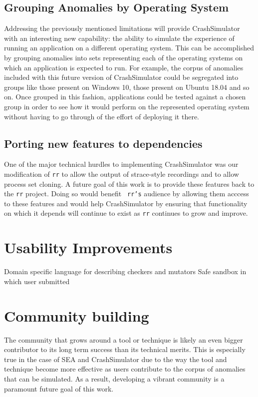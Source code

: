\documentclass[twocolumn]{article}
\begin{document}
\subsection{Grouping Anomalies by Operating System}

Addressing the previously mentioned limitations will provide CrashSimulator
with an interesting new capability: the ability to simulate the experience
of running an application on a different operating system.  This can be
accomplished by grouping anomalies into sets representing each of the
operating systems on which an application is expected to run. For example,
the corpus of anomalies included with this future version of CrashSimulator
could be segregated into groups like those present on Windows 10, those
present on Ubuntu 18.04 and so on.  Once grouped in this fashion,
applications could be tested against a chosen group in order to see how it
would perform on the represented operating system without having to go
through of the effort of deploying it there.


\subsection{Porting new features to dependencies}

One of the major technical hurdles to implementing CrashSimulator was our
modification of {\tt rr} to allow the output of strace-style recordings and
to allow process set cloning.  A future goal of this work is to provide
these features back to the {\tt rr} project.  Doing so would benefit {\tt
rr's} audience by allowing them acccess to these features
and would help CrashSimulator by ensuring that functionality on which it
depends will continue to exist as {\tt rr} continues to grow and improve.


\section{Usability Improvements}
  Domain specific language for describing checkers and mutators
  Safe sandbox in which user submitted


\section{Community building}

The community that grows around a tool or technique is likely an even
bigger contributor to its long term success than its technical merits.
This is especially true in the case of SEA and CrashSimulator due to the
way the tool and technique become more effective as users contribute to the
corpus of anomalies that can be simulated.  As a result, developing a
vibrant community is a paramount future goal of this work.
\end{document}
